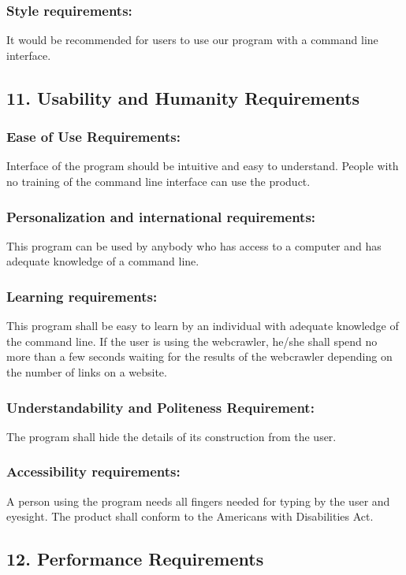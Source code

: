 \documentclass[titlepage]{article}
\begin{document}
\subsubsection*{Style requirements: }It would be recommended for users to use our program with a command line interface.

\subsection{11. Usability and Humanity Requirements }

\subsubsection*{Ease of Use Requirements:} Interface of the program should be intuitive and easy to understand. People with no training of the command line interface can use the product.

\subsubsection*{Personalization and international requirements: }This program can be used by anybody who has access to a computer and has adequate knowledge of a command line.

\subsubsection*{Learning requirements:}  This program shall be easy to learn by an individual with adequate knowledge of the command line. If the user is using the webcrawler, he/she shall spend no more than a few seconds waiting for the results of the webcrawler depending on the number of links on a website.

\subsubsection*{Understandability and Politeness Requirement: }The program shall hide the details of its construction from the user.

\subsubsection*{Accessibility requirements:} A person using the program needs all fingers needed for typing by the user and eyesight. The product shall conform to the Americans with Disabilities Act.

\subsection{12. Performance Requirements }
\end{document}
